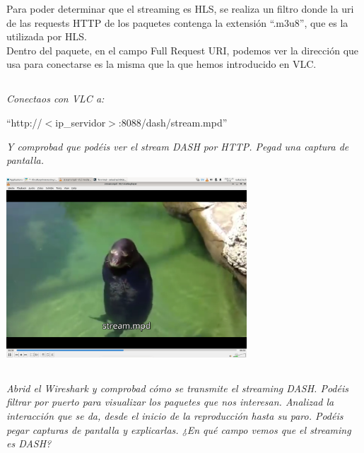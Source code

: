 \documentclass[spanish]{article}
\begin{document}
Para poder determinar que el streaming es HLS, se realiza
un filtro donde la uri de las requests HTTP de los paquetes
contenga la extensión ``.m3u8'', que es la utilizada por
HLS.\\

Dentro del paquete, en el campo Full Request URI, podemos
ver la dirección que usa para conectarse es la misma que la
que hemos introducido en VLC.

\newpage

\subsection{}

\textit{Conectaos con VLC a:}

\begin{center}
``http://\(<\)ip\_servidor\(>\):8088/dash/stream.mpd''
\end{center}

\textit{Y comprobad que podéis ver el stream DASH por HTTP. Pegad
una captura de pantalla.}

\begin{center}
\includegraphics[width=9cm]{../img/15.png}
\end{center}

\newpage

\subsection{}

\textit{Abrid el Wireshark y comprobad cómo se transmite el
streaming DASH. Podéis filtrar por puerto para visualizar
los paquetes que nos interesan. Analizad la interacción que
se da, desde el inicio de la reproducción hasta su paro.
Podéis pegar capturas de pantalla y explicarlas. ¿En qué
campo vemos que el \textit{streaming} es DASH?}
\end{document}
